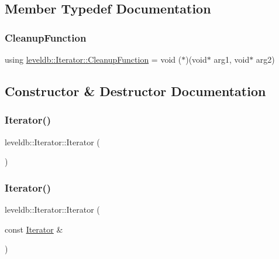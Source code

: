 \subsection{Member Typedef Documentation}
\mbox{\label{classleveldb_1_1_iterator_aefcc7b475ddca596fe2429a2976e7730}} 
\subsubsection{\texorpdfstring{CleanupFunction}{CleanupFunction}}
{\footnotesize\ttfamily using \mbox{\hyperlink{classleveldb_1_1_iterator_aefcc7b475ddca596fe2429a2976e7730}{leveldb\+::\+Iterator\+::\+Cleanup\+Function}} =  void ($\ast$)(void$\ast$ arg1, void$\ast$ arg2)}



\subsection{Constructor \& Destructor Documentation}
\mbox{\label{classleveldb_1_1_iterator_a1dc1cbc893e55a3fc990f08cf191480a}} 
\subsubsection{\texorpdfstring{Iterator()}{Iterator()}\hspace{0.1cm}{\footnotesize\ttfamily [1/2]}}
{\footnotesize\ttfamily leveldb\+::\+Iterator\+::\+Iterator (\begin{DoxyParamCaption}{ }\end{DoxyParamCaption})}

\mbox{\label{classleveldb_1_1_iterator_abe49ca39e162abccbfd1f0582a14354b}} 
\subsubsection{\texorpdfstring{Iterator()}{Iterator()}\hspace{0.1cm}{\footnotesize\ttfamily [2/2]}}
{\footnotesize\ttfamily leveldb\+::\+Iterator\+::\+Iterator (\begin{DoxyParamCaption}\item[{const \mbox{\hyperlink{classleveldb_1_1_iterator}{Iterator}} \&}]{ }\end{DoxyParamCaption})\hspace{0.3cm}{\ttfamily [delete]}}

